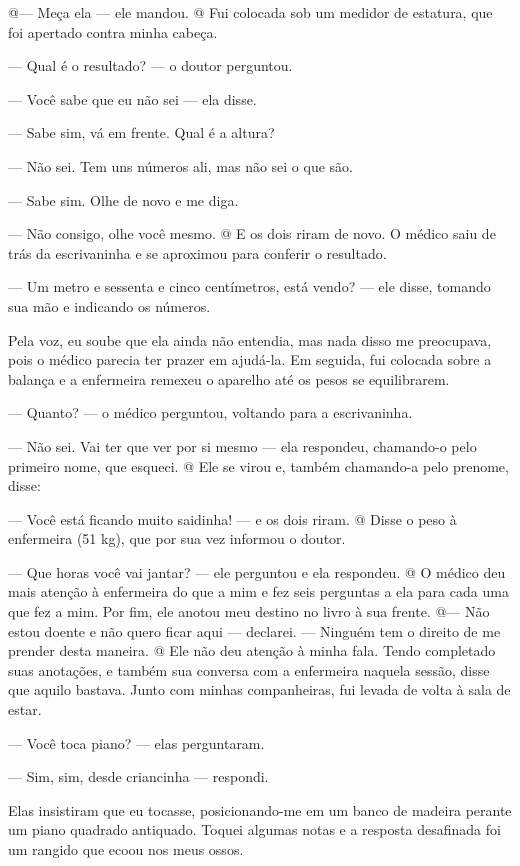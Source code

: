 @--- Meça ela --- ele mandou. @ Fui colocada sob um medidor de estatura,
que foi apertado contra minha cabeça.

--- Qual é o resultado? --- o doutor perguntou.

--- Você sabe que eu não sei --- ela disse.

--- Sabe sim, vá em frente. Qual é a altura?

--- Não sei. Tem uns números ali, mas não sei o que são.

--- Sabe sim. Olhe de novo e me diga.

--- Não consigo, olhe você mesmo. @ E os dois riram de novo. O médico
saiu de trás da escrivaninha e se aproximou para conferir o resultado.

--- Um metro e sessenta e cinco centímetros, está vendo? --- ele disse,
tomando sua mão e indicando os números.

Pela voz, eu soube que ela ainda não entendia, mas nada disso me
preocupava, pois o médico parecia ter prazer em ajudá-la. Em seguida,
fui colocada sobre a balança e a enfermeira remexeu o aparelho até os
pesos se equilibrarem.

--- Quanto? --- o médico perguntou, voltando para a escrivaninha.

--- Não sei. Vai ter que ver por si mesmo --- ela respondeu, chamando-o
pelo primeiro nome, que esqueci. @ Ele se virou e, também chamando-a
pelo prenome, disse:

--- Você está ficando muito saidinha! --- e os dois riram. @ Disse o
peso à enfermeira (51 kg), que por sua vez informou o doutor.

--- Que horas você vai jantar? --- ele perguntou e ela respondeu. @ O
médico deu mais atenção à enfermeira do que a mim e fez seis perguntas a
ela para cada uma que fez a mim. Por fim, ele anotou meu destino no
livro à sua frente. @--- Não estou doente e não quero ficar aqui ---
declarei. --- Ninguém tem o direito de me prender desta maneira. @ Ele
não deu atenção à minha fala. Tendo completado suas anotações, e também
sua conversa com a enfermeira naquela sessão, disse que aquilo bastava.
Junto com minhas companheiras, fui levada de volta à sala de estar.

--- Você toca piano? --- elas perguntaram.

--- Sim, sim, desde criancinha --- respondi.

Elas insistiram que eu tocasse, posicionando-me em um banco de madeira
perante um piano quadrado antiquado. Toquei algumas notas e a resposta
desafinada foi um rangido que ecoou nos meus ossos.

